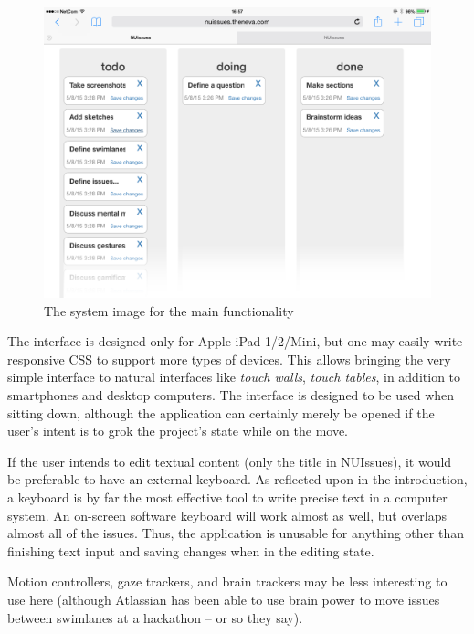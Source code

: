 \begin{figure}[H]
    \centerline{\includegraphics[scale=0.4]{images/nuissues-screenshots/01-default-all-swimlanes}}
    \caption{The system image for the main functionality}
    \label{figure:ipad-default-simple-screenshots}  
\end{figure}

The interface is designed only for Apple iPad 1/2/Mini, but one may easily write responsive CSS to support more types of devices. This allows bringing the very simple interface to natural interfaces like \textit{touch walls}, \textit{touch tables}, in addition to smartphones and desktop computers. The interface is designed to be used when sitting down, although the application can certainly merely be opened if the user's intent is to grok the project's state while on the move.

If the user intends to edit textual content (only the title in NUIssues), it would be preferable to have an external keyboard. As reflected upon in the introduction, a keyboard is by far the most effective tool to write precise text in a computer system. An on-screen software keyboard will work almost as well, but overlaps almost all of the issues. Thus, the application is unusable for anything other than finishing text input and saving changes when in the editing state.


Motion controllers, gaze trackers, and brain trackers may be less interesting to use here (although Atlassian has been able to use brain power to move issues between swimlanes at a hackathon – or so they say).

